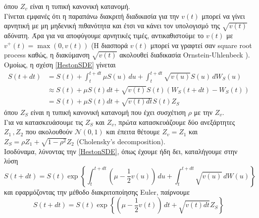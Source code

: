 \documentclass[12pt,a4paper,twoside,openany]{book}
\begin{document}
 	όπου $Z_v$ είναι η τυπική κανονική κατανομή.\\ 
 	Γίνεται εμφανές ότι η παραπάνω διακριτή διαδικασία για την $v(t)$ μπορεί να γίνει αρνητική με μη μηδενική πιθανότητα και έτσι να κάνει τον υπολογισμό της $\sqrt{v(t)}$ αδύνατη. Άρα για να αποφύγουμε αρνητικές τιμές, αντικαθιστούμε το $v(t)$ με $v^+(t)=\max(0,v(t))$ (Η διασπορά $v(t)$ μπορεί να γραφτεί σαν square root process καθώς, η διακύμανση $\sqrt{v(t)}$ ακολουθεί διαδικασία Ornstein-Uhlenbeck \cite{Heston}).
 	\vspace{2.5mm}\\
 	Ομοίως, η σχέση \eqref{HestonSDE} γίνεται 
 	\begin{align*}
 		S(t+dt) &= S(t) + \int_{t}^{t+dt}\mu S(u)\, du + \int_{t}^{t+dt}\sqrt{v(u)} S(u)\, dW_S(u) \\
 				&\approx S(t) + \mu S(t)dt + \sqrt{v(t)} S(t)(W_S(t+dt) - W_S(t)) \\
 				&= S(t) + \mu S(t)dt + \sqrt{v(t)dt} S(t)Z_S
 	\end{align*}
 	όπου $Z_S$ είναι η τυπική κανονική κατανομή που έχει συσχέτιση $\rho$ με την $Z_v$.\\ 
 	Για να κατασκευάσουμε τις $Z_S$ και $Z_v$, πρώτα κατασκευάζουμε δύο ανεξάρτητες $Z_1\,,Z_2$ που ακολουθούν $\mathcal{N}(0,1)$ και έπειτα θέτουμε $Z_v=Z_1$ και $Z_S= \rho Z_1 + \sqrt{1-\rho^2}Z_2$ (Cholensky's decomposition).
 	\vspace{2.5mm}\\
 	Ισοδύναμα, λύνοντας την \eqref{HestonSDE}, όπως έχουμε ήδη δει, καταλήγουμε στην λύση
 	\[S(t+dt)= S(t)\exp\left\{ \int_{t}^{t+dt}\left(\mu-\frac{1}{2}v(u)\right)\, du + \int_{t}^{t+dt}\sqrt{v(u)}\, dW(u)\right\} \]
 	και εφαρμόζοντας την μέθοδο διακριτοποίησης Euler, παίρνουμε
 	\[S(t+dt)= S(t)\exp\left\{ \left(\mu-\frac{1}{2}v(t)\right)\, dt + \sqrt{v(t)dt}Z_S\right\} \]
 	
\end{document}
